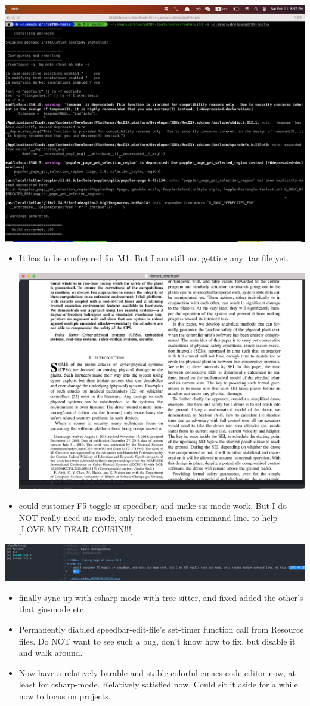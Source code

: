 \documentclass[9pt, b5paper]{article}
\begin{document}
\includegraphics[width=.9\linewidth]{./pic/Snipaste_2023-02-11_20-57-40.png}
\begin{itemize}
\item It has to be configured for M1. But I am still not getting any .tar file yet. 

\includegraphics[width=.9\linewidth]{./pic/Snipaste_2023-02-11_22-20-25.png}
\item could customer F5 toggle sr-speedbar, and make sis-mode work. But I do NOT really need sis-mode, only needed macism command line. to help [LOVE MY DEAR COUSIN!!!]
\end{itemize}

\includegraphics[width=.9\linewidth]{./pic/readme_20230210_221127.png}
\begin{itemize}
\item finally sync up with csharp-mode with tree-sitter, and fixed added the other's that gio-mode etc.
\item Permanently diabled speedbar-edit-file's set-timer function call from Resource files. Do NOT want to see such a bug, don't know how to fix, but disable it and walk around.
\item Now have a relatively barable and stable colorful emacs code editor now, at least for csharp-mode. Relatively satisfied now. Could sit it aside for a while now to focus on projects.
\end{itemize}
\end{document}
